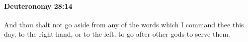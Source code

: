 
		\paragraph{Deuteronomy 28:14} %
			\label{DEUTERONOMY-28-14}

			And thou shalt not go aside from any of the words which I command thee this day, to the right hand, or to the left, to go after other gods to serve them.



